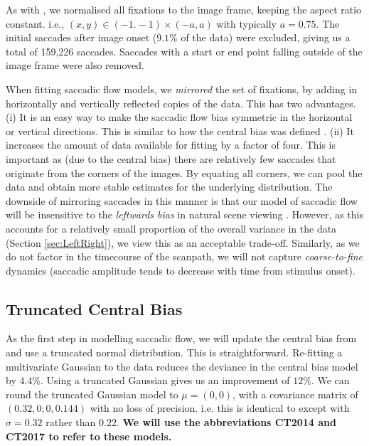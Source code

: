 \documentclass[a4paper, twocolumn, oneside, 11pt]{article}
\begin{document}
As with \cite{clarke-tatler2014}, we normalised all fixations to the image frame, keeping the aspect ratio constant. i.e., $(x,y)\in (-1.-1)\times(-a,a)$ with typically $a=0.75$. The initial saccades after image onset ($9.1\%$ of the data) were excluded, giving us a total of 159,226 saccades. Saccades with a start or end point falling outside of the image frame were also removed. 

When fitting saccadic flow models, we \textit{mirrored} the set of fixations, by adding in horizontally and vertically reflected copies of the data. This has two advantages. (i) It is an easy way to make the saccadic flow bias symmetric in the horizontal or vertical directions. This is similar to how the central bias was defined \cite{clarke-tatler2014}. (ii) It increases the amount of data available for fitting by a factor of four. This is important as (due to the central bias) there are relatively few saccades that originate from the corners of the images. By equating all corners, we can pool the data and obtain more stable estimates for the underlying distribution. The downside of mirroring saccades in this manner is that our model of saccadic flow will be insensitive to the \textit{leftwards bias} in natural scene viewing \citep{nuthmann-matthias2014}. However, as this accounts for a relatively small proportion of the overall variance in the data (Section \ref{sec:LeftRight}), we view this as an acceptable trade-off. Similarly, as we do not factor in the timecourse of the scanpath, we will not capture \textit{coarse-to-fine} dynamics (saccadic amplitude tends to decrease with time from stimulus onset).


\subsection{Truncated Central Bias}
\label{sec:truncatedCentral}

As the first step in modelling saccadic flow, we will update the central bias from \cite{clarke-tatler2014} and use a truncated normal distribution. This is straightforward. Re-fitting a multivariate Gaussian to the data reduces the deviance in the central bias model by $4.4\%$. Using a truncated Gaussian gives us an improvement of $12\%$. We can round the truncated Gaussian model to $\mu = (0,0)$, with a covariance matrix of $(0.32, 0; 0, 0.144)$ with no loss of precision. i.e. this is identical to \cite{clarke-tatler2014} except with $\sigma=0.32$ rather than $0.22$. \textbf{We will use the abbreviations CT2014 and CT2017 to refer to these models.}
\end{document}
